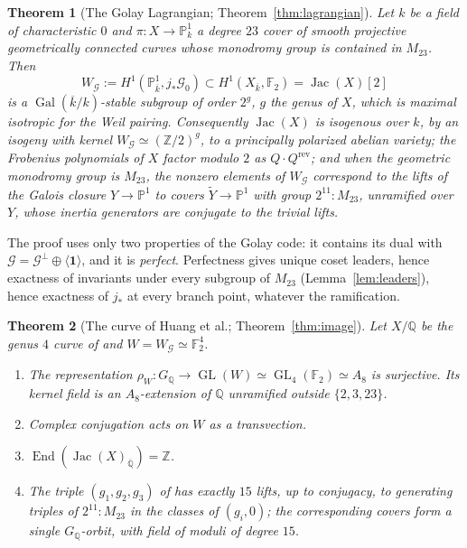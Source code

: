 \documentclass[11pt]{amsart}
\newtheorem{maintheorem}{Theorem}
\theoremstyle{definition}
\newcommand{\QQ}{\mathbb{Q}}
\newcommand{\ZZ}{\mathbb{Z}}
\newcommand{\FF}{\mathbb{F}}
\newcommand{\PP}{\mathbb{P}}
\newcommand{\Qbar}{\overline{\QQ}}
\newcommand{\kbar}{\overline{k}}
\newcommand{\Gal}{\operatorname{Gal}}
\newcommand{\End}{\operatorname{End}}
\newcommand{\Jac}{\operatorname{Jac}}
\newcommand{\GL}{\operatorname{GL}}
\newcommand{\rev}{\mathrm{rev}}
\newcommand{\M}{M_{23}}
\newcommand{\cG}{\mathcal{G}}
\newcommand{\one}{\mathbf{1}}
\newcommand{\GQ}{G_{\QQ}}
\begin{document}
\begin{maintheorem}[The Golay Lagrangian; Theorem~\ref{thm:lagrangian}]\label{thmA}
Let $k$ be a field of characteristic $0$ and $\pi\colon X\to\PP^1_k$ a degree $23$ cover of smooth projective geometrically connected curves whose monodromy group is contained in $\M$. Then
\[
W_\cG:=H^1(\PP^1_{\kbar},j_*\cG_0)\subset H^1(X_{\kbar},\FF_2)=\Jac(X)[2]
\]
is a $\Gal(\kbar/k)$-stable subgroup of order $2^{g}$, $g$ the genus of $X$, which is maximal isotropic for the Weil pairing. Consequently $\Jac(X)$ is isogenous over $k$, by an isogeny with kernel $W_\cG\simeq(\ZZ/2)^g$, to a principally polarized abelian variety; the Frobenius polynomials of $X$ factor modulo $2$ as $Q\cdot Q^{\rev}$; and when the geometric monodromy group is $\M$, the nonzero elements of $W_\cG$ correspond to the lifts of the Galois closure $Y\to\PP^1$ to covers $\widetilde Y\to\PP^1$ with group $2^{11}{:}\M$, unramified over $Y$, whose inertia generators are conjugate to the trivial lifts.
\end{maintheorem}

The proof uses only two properties of the Golay code: it contains its dual with $\cG=\cG^\perp\oplus\langle\one\rangle$, and it is \emph{perfect}. Perfectness gives unique coset leaders, hence exactness of invariants under every subgroup of $\M$ (Lemma~\ref{lem:leaders}), hence exactness of $j_*$ at every branch point, whatever the ramification.

\begin{maintheorem}[The curve of Huang et al.; Theorem~\ref{thm:image}]\label{thmB}
Let $X/\QQ$ be the genus $4$ curve of \cite{HJLPPZ26} and $W=W_\cG\simeq\FF_2^4$.
\begin{enumerate}[label=\textup{(\roman*)}]
\item The representation $\rho_W\colon\GQ\to\GL(W)\simeq\GL_4(\FF_2)\simeq A_8$ is surjective. Its kernel field is an $A_8$-extension of $\QQ$ unramified outside $\{2,3,23\}$.
\item Complex conjugation acts on $W$ as a transvection.
\item $\End(\Jac(X)_{\Qbar})=\ZZ$.
\item The triple $(g_1,g_2,g_3)$ of \cite{HJLPPZ26} has exactly $15$ lifts, up to conjugacy, to generating triples of $2^{11}{:}\M$ in the classes of $(g_i,0)$; the corresponding covers form a single $\GQ$-orbit, with field of moduli of degree $15$.
\end{enumerate}
\end{maintheorem}
\end{document}
